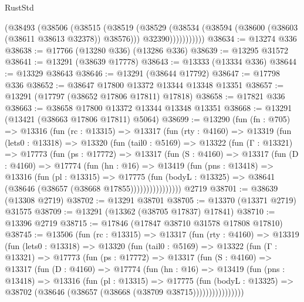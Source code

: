 \begin{lexlean}{RustStd}
\begin{coremodule}
                (@38493
                  (@38506
                    (@38515
                      (@38519
                        (@38529
                          (@38534 (@38594 (@38600 (@38603 (@38611 @38613 @32378)) @38576)))
                          @32390)))))))))))
@38634 := @13274 @336
@38638 := @17766 (@13280 @336) (@13286 @336)
@38639 := @13295 @31572
@38641 := @13291 (@38639 @17778)
@38643 := @13333 (@13334 @336)
@38644 := @13329 @38643
@38646 := @13291 (@38644 @17792)
@38647 := @17798 @336
@38652 := @38647 @17800 @13372 @13344 @13348 @13351
@38657 := @13291 (@17797 (@38652 @17806 @17811) @17818)
@38658 := @17821 @336
@38663 := @38658 @17800 @13372 @13344 @13348 @13351
@38668 := @13291 (@13421 (@38663 @17806 @17811) @5064)
@38699 := @13290
    (fun (fn : @705) =>
    @13316
      (fun (rc : @13315) =>
      @13317
        (fun (rty : @4160) =>
        @13319
          (fun (lets0 : @13318) =>
          @13320
            (fun (tail0 : @5169) =>
            @13322
              (fun (Γ : @13321) =>
              @17773
                (fun (ps : @17772) =>
                @13317
                  (fun (S : @4160) =>
                  @13317
                    (fun (D : @4160) =>
                    @17774
                      (fun (hn : @16) =>
                      @13419
                        (fun (pns : @13418) =>
                        @13316
                          (fun (pl : @13315) =>
                          @17775
                            (fun (bodyL : @13325) =>
                            @38641 (@38646 (@38657 (@38668 @17855))))))))))))))))
    @2719
@38701 := @38639 (@13308 @2719)
@38702 := @13291 @38701
@38705 := @13370 (@13371 @2719) @31575
@38709 := @13291 (@13362 (@38705 @17837) @17841)
@38710 := @13396 @2719
@38715 := @17846 (@17847 @38710 @31578 @17808 @17810)
@38745 := @13506
    (fun (rc : @13315) =>
    @13317
      (fun (rty : @4160) =>
      @13319
        (fun (lets0 : @13318) =>
        @13320
          (fun (tail0 : @5169) =>
          @13322
            (fun (Γ : @13321) =>
            @17773
              (fun (ps : @17772) =>
              @13317
                (fun (S : @4160) =>
                @13317
                  (fun (D : @4160) =>
                  @17774
                    (fun (hn : @16) =>
                    @13419
                      (fun (pns : @13418) =>
                      @13316
                        (fun (pl : @13315) =>
                        @17775
                          (fun (bodyL : @13325) =>
                          @38702 (@38646 (@38657 (@38668 (@38709 @38715))))))))))))))))

\end{coremodule}
\end{lexlean}

